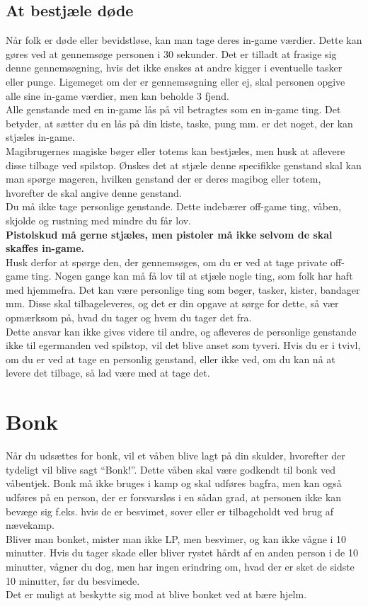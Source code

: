 \subsection{At bestjæle døde}
Når folk er døde eller bevidstløse, kan man tage deres in-game værdier. Dette kan gøres ved at gennemsøge personen i 30 sekunder. Det er tilladt at frasige sig denne gennemsøgning, hvis det ikke ønskes at andre kigger i eventuelle tasker eller punge.
Ligemeget om der er gennemsøgning eller ej, skal personen opgive alle sine in-game værdier, men kan beholde 3 fjend.\\
Alle genstande med en in-game lås på vil betragtes som en in-game ting. Det betyder, at sætter du en lås på din kiste, taske, pung mm. er det noget, der kan stjæles in-game.\\
Magibrugernes magiske bøger eller totems kan bestjæles, men husk at aflevere disse tilbage ved spilstop. Ønskes det at stjæle denne specifikke genstand skal kan man spørge mageren, hvilken genstand der er deres magibog eller totem, hvorefter de skal angive denne genstand.\\
Du må ikke tage personlige genstande. Dette indebærer off-game ting, våben, skjolde og rustning med mindre du får lov.\\
\textbf{Pistolskud må gerne stjæles, men pistoler må ikke selvom de skal skaffes in-game.}\\
Husk derfor at spørge den, der gennemsøges, om du er ved at tage private off-game ting.
Nogen gange kan må få lov til at stjæle nogle ting, som folk har haft med hjemmefra. Det kan være personlige ting som bøger, tasker, kister, bandager mm. Disse skal tilbageleveres, og det er din opgave at sørge for dette, så vær opmærksom på, hvad du tager og hvem du tager det fra.\\
Dette ansvar kan ikke gives videre til andre, og afleveres de personlige genstande ikke til egermanden ved spilstop, vil det blive anset som tyveri. Hvis du er i tvivl, om du er ved at tage en personlig genstand, eller ikke ved, om du kan nå at levere det tilbage, så lad være med at tage det.

\section{Bonk}\label{Reg:Bonk}
Når du udsættes for bonk, vil et våben blive lagt på din skulder, hvorefter der tydeligt vil blive sagt “Bonk!”. Dette våben skal være godkendt til bonk ved våbentjek.
Bonk må ikke bruges i kamp og skal udføres bagfra, men kan også udføres på en person, der er forsvarsløs i en sådan grad, at personen ikke kan bevæge sig f.eks. hvis de er besvimet, sover eller er tilbageholdt ved brug af nævekamp.\\
Bliver man bonket, mister man ikke LP, men besvimer, og kan ikke vågne i 10 minutter. Hvis du tager skade eller bliver rystet hårdt af en anden person i de 10 minutter, vågner du dog, men har ingen erindring om, hvad der er sket de sidste 10 minutter, før du besvimede.\\
Det er muligt at beskytte sig mod at blive bonket ved at bære hjelm.

